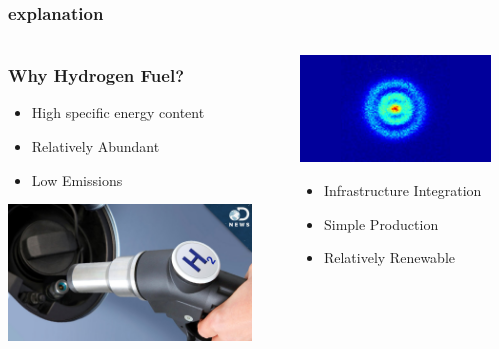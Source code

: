 \documentclass[10pt]{beamer}
\begin{document}
\begin{frame}
\frametitle{explanation}
\begin{columns}
\begin{column}{0.5\textwidth}
   \frametitle{Why Hydrogen Fuel?}
     \begin{itemize}
      \item High specific energy content
      \item Relatively Abundant
      \item Low Emissions
      \end{itemize}
      
      \begin{center}
     \includegraphics[width=0.9\textwidth]{noz.jpg}
     \end{center}
\end{column}
\begin{column}{0.5\textwidth}  %
    \begin{center}
     \includegraphics[width=0.9\textwidth]{hyd}
     \end{center}
     
     \begin{itemize}
      \item Infrastructure Integration
      \item Simple Production
      \item Relatively Renewable 
      \end{itemize}
\end{column}
\end{columns}
\end{frame}
\end{document}
